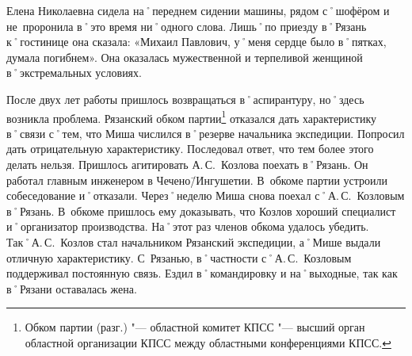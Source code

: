 Елена Николаевна сидела на˚переднем сидении машины, рядом с˚шофёром и не~проронила в˚это время ни˚одного слова. Лишь˚по приезду в˚Рязань к˚гостинице она сказала: «Михаил Павлович, у˚меня сердце было в˚пятках, думала погибнем». Она оказалась мужественной и терпеливой женщиной в˚экстремальных условиях.

После двух лет работы пришлось возвращаться в˚аспирантуру, но˚здесь возникла проблема. Рязанский обком партии\footnote{Обком партии (разг.) "--- областной комитет КПСС "--- высший орган областной организации КПСС между областными конференциями КПСС.} отказался дать характеристику в˚связи с˚тем, что Миша числился в˚резерве начальника экспедиции. Попросил дать отрицательную характеристику. Последовал ответ, что тем более этого делать нельзя. Пришлось агитировать А.\,С.~Козлова поехать в˚Рязань. Он работал главным инженером в Чечено\=/Ингушетии. В~обкоме партии устроили собеседование и˚отказали. Через˚неделю Миша снова поехал с˚А.\,С.~Козловым в˚Рязань. В~обкоме пришлось ему доказывать, что Козлов хороший специалист и˚организатор производства. На˚этот раз членов обкома удалось убедить. Так˚А.\,С.~Козлов стал начальником Рязанский экспедиции, а˚Мише выдали отличную характеристику. С~Рязанью, в˚частности с˚А.\,С.~Козловым поддерживал постоянную связь. Ездил в˚командировку и на˚выходные, так как в˚Рязани оставалась жена. 